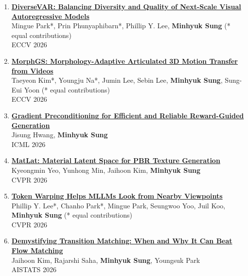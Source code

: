 \documentclass[letterpaper,10pt]{article} %
\newcommand{\blankline}{\quad\pagebreak[2]}
\begin{document}
\begin{enumerate}
\item \label{eccv26_1}
\href{https://arxiv.org/abs/2511.21415}{\textbf{DiverseVAR: Balancing Diversity and Quality of Next-Scale Visual Autoregressive Models}}\\
Mingue Park*, Prin Phunyaphibarn*, Phillip Y. Lee, \textbf{Minhyuk Sung} (* equal contributions)\\
ECCV 2026\
\blankline

\item \label{eccv26_morphgs}
\href{https://arxiv.org/abs/2601.02716}{\textbf{MorphGS: Morphology-Adaptive Articulated 3D Motion Transfer from Videos}}\\
Taeyeon Kim*, Youngju Na*, Jumin Lee, Sebin Lee, \textbf{Minhyuk Sung}, Sung-Eui Yoon (* equal contributions)\\
ECCV 2026\\
\blankline

\item \label{icml26}
\href{https://arxiv.org/abs/2602.08646}{\textbf{Gradient Preconditioning for Efficient and Reliable Reward-Guided Generation}}\\
Jisung Hwang, \textbf{Minhyuk Sung}\\
ICML 2026\\
\blankline

\item \label{cvpr26_2}
\href{https://arxiv.org/abs/2512.17302}{\textbf{MatLat: Material Latent Space for PBR Texture Generation}}\\
Kyeongmin Yeo, Yunhong Min, Jaihoon Kim, \textbf{Minhyuk Sung}\\
CVPR 2026\\
\blankline

\item \label{cvpr26_1}
\href{https://arxiv.org/abs/2604.02870}{\textbf{Token Warping Helps MLLMs Look from Nearby Viewpoints}}\\
Phillip Y. Lee*, Chanho Park*, Mingue Park, Seungwoo Yoo, Juil Koo, \textbf{Minhyuk Sung} (* equal contributions)\\
CVPR 2026\\
\blankline

\item \label{aistats26}
\href{https://arxiv.org/abs/2510.17991}{\textbf{Demystifying Transition Matching: When and Why It Can Beat Flow Matching}}\\
Jaihoon Kim, Rajarshi Saha, \textbf{Minhyuk Sung}, Youngsuk Park\\
AISTATS 2026\\
\blankline


\end{enumerate}
\end{document}
